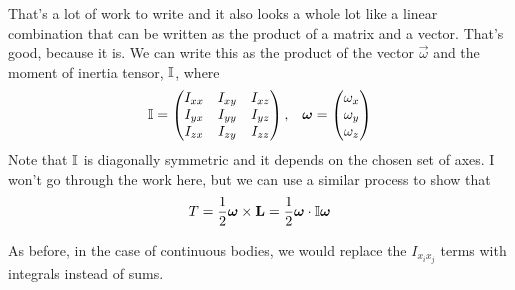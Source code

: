 \documentclass[a4paper]{article}
\begin{document}
That's a lot of work to write and it also looks a whole lot like a linear
combination that can be written as the product of a matrix and a vector.
That's good, because it is. We can write this as the product of the vector
$\vec{\omega}$ and the moment of inertia tensor, $\mathbb{I}$, where
\begin{align*}
	\mathbb{I} &=
	\begin{pmatrix}
		I_{xx} & I_{xy} & I_{xz}\\
		I_{yx} & I_{yy} & I_{yz}\\
		I_{zx} & I_{zy} & I_{zz}
	\end{pmatrix}
	,&\boldsymbol{\mathbf{\omega}} =
	\begin{pmatrix}
		\omega_x\\
		\omega_y\\
		\omega_z
	\end{pmatrix}
\end{align*}
Note that $\mathbb{I}$ is diagonally symmetric and it depends on the chosen set of
axes.
I won't go through the work here, but we can use a similar process to show
that
\[ T = \frac{1}{2}\boldsymbol{\mathbf{\omega}}\times\boldsymbol{\mathbf{L}} = \frac{1}{2}\boldsymbol{\mathbf{\omega}}\cdot
\mathbb{I}\boldsymbol{\mathbf{\omega}} \]

As before, in the case of continuous bodies, we would replace the $I_{x_ix_j}$
terms with integrals instead of sums.
\end{document}
